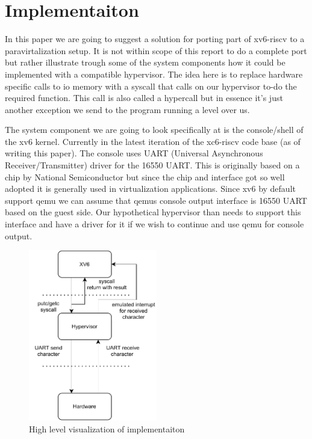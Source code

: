 \section{Implementaiton}
\label{imp}

In this paper we are going to suggest a solution for porting part of xv6-riscv \cite{xv6} to a paravirtalization setup. It is not within scope of this report to do a complete port but rather illustrate trough some of the system components how it could be implemented with a compatible hypervisor. The idea here is to replace hardware specific calls to io memory with a syscall that calls on our hypervisor to-do the required function. This call is also called a hypercall but in essence it’s just another exception we send to the program running a level over us. 

The system component we are going to look specifically at is the console/shell of the xv6 kernel. Currently in the latest iteration of the xc6-riscv \cite{xv6} code base (as of writing this paper). The console uses UART (Universal Asynchronous Receiver/Transmitter) driver for the 16550 UART. This is originally based on a chip by National Semiconductor but since the chip and interface got so well adopted it is generally used in virtualization applications. Since xv6 by default support qemu we can assume that qemus console output interface is 16550 UART based on the guest side. Our hypothetical hypervisor than needs to support this interface and have a driver for it if we wish to continue and use qemu for console output.


\begin{figure}[htbp]
    \centering
    \includegraphics[width=0.5\textwidth]{Images/tdt09_uart_hypervisor.drawio.pdf}
    \caption{High level visualization of implementaiton}
    \label{fig:uart-hype-hardware}
\end{figure}

